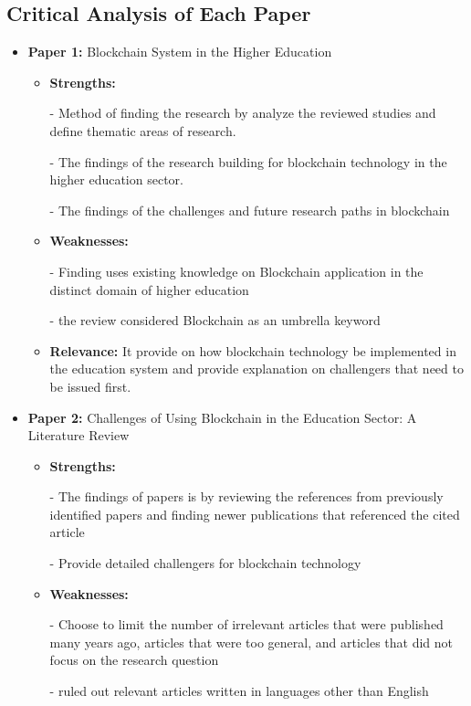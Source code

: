 \documentclass[12pt,a4paper]{article}
\begin{document}
\subsection{Critical Analysis of Each Paper}
\begin{itemize}
    \item \textbf{Paper 1:} Blockchain System in the Higher Education 
    \begin{itemize}
        \item \textbf{Strengths:}
        
        - Method of finding the research by analyze the reviewed studies and define thematic areas of research.

        - The findings of the research building for blockchain technology in the higher education sector.

        - The findings of the challenges and future research paths in blockchain
        \item \textbf{Weaknesses:} 

        - Finding uses existing knowledge on Blockchain application in the distinct domain of higher education

        - the review considered Blockchain as an umbrella keyword
        \item \textbf{Relevance: } It provide on how blockchain technology be implemented in the education system and provide explanation on challengers that need to be issued first.
    \end{itemize}
    \item \textbf{Paper 2:} Challenges of Using Blockchain in the Education Sector: A Literature Review
    \begin{itemize}
        \item \textbf{Strengths:} 
        
        - The findings of papers is by reviewing the references from previously identified papers and finding newer publications that referenced the cited article

        - Provide detailed challengers for blockchain technology
        \item \textbf{Weaknesses:} 

        - Choose to limit the number of irrelevant articles that were published many years ago, articles that were too general, and articles that did not focus on the research question

        - ruled out relevant articles written in languages other than English


\end{itemize}
\end{itemize}
\end{document}
